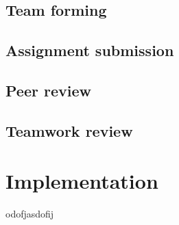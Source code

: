 \subsection{Team forming}

\subsection{Assignment submission}

\subsection{Peer review}

\subsection{Teamwork review}

\section{Implementation}
odofjasdofij